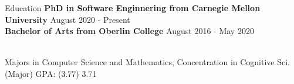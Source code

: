 \documentclass{resume}
\begin{document}
\begin{rSection}{Education}
{\bf PhD in Software Enginnering from Carnegie Mellon University} \hfill { August 2020 - Present} \\ 
{\bf Bachelor of Arts from Oberlin College} \hfill { August 2016 - May 2020} 

\\ Majors in Computer Science and Mathematics, Concentration in Cognitive Sci. \hfill {(Major) GPA: (3.77) 3.71}
\end{rSection}
\end{document}
